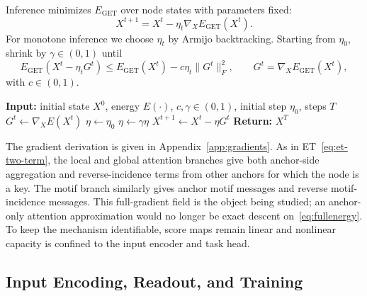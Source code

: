 \documentclass[11pt,a4paper]{article}
\begin{document}
Inference minimizes $E_{\mathrm{GET}}$ over node states with parameters fixed:
\begin{equation}
  X^{t+1} = X^t - \eta_t\nabla_X E_{\mathrm{GET}}(X^t).
  \label{eq:update}
\end{equation}
For monotone inference we choose $\eta_t$ by Armijo backtracking. Starting
from $\eta_0$, shrink by $\gamma\in(0,1)$ until
\begin{equation}
  E_{\mathrm{GET}}(X^t - \eta_t G^t)
  \le E_{\mathrm{GET}}(X^t) - c\eta_t\|G^t\|_F^2,
  \qquad G^t = \nabla_X E_{\mathrm{GET}}(X^t),
  \label{eq:armijo}
\end{equation}
with $c\in(0,1)$.

\begin{minipage}{\textwidth}
\begin{algorithm}[H]
\caption{GET Inference by Monotone Armijo Descent}
\label{alg:armijo}
\begin{algorithmic}[1]
\STATE \textbf{Input:} initial state $X^0$, energy $E(\cdot)$, $c,\gamma\in(0,1)$, initial step $\eta_0$, steps $T$
  \STATE $G^t \gets \nabla_X E(X^t)$
  \STATE $\eta \gets \eta_0$
    \STATE $\eta \gets \gamma\eta$
  \ENDWHILE
  \STATE $X^{t+1} \gets X^t - \eta G^t$
\ENDFOR
\STATE \textbf{Return:} $X^T$
\end{algorithmic}
\end{algorithm}
\end{minipage}

The gradient derivation is given in Appendix~\ref{app:gradients}. As in
ET~\eqref{eq:et-two-term}, the local and global attention branches give both
anchor-side aggregation and reverse-incidence terms from other anchors for
which the node is a key. The motif branch similarly gives anchor motif messages
and reverse motif-incidence messages. This full-gradient field is the object
being studied; an anchor-only attention approximation would no longer be exact
descent on~\eqref{eq:fullenergy}. To keep the mechanism identifiable, score
maps remain linear and nonlinear capacity is confined to the input encoder and
task head.

\subsection{Input Encoding, Readout, and Training}
\end{document}
